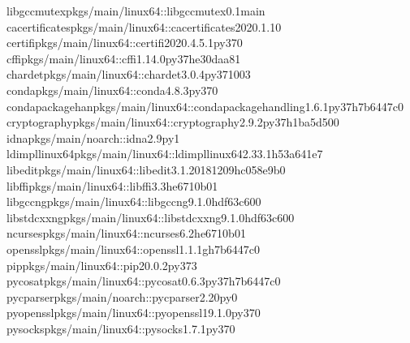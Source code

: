 \documentclass[a4paper,10pt,english]{sphinxmanual}
\begin{document}
\begin{sphinxVerbatim}[commandchars=\\\{\}]
\PYGZus{}libgcc\PYGZus{}mutexpkgs/main/linux\PYGZhy{}64::\PYGZus{}libgcc\PYGZus{}mutex\PYGZhy{}0.1\PYGZhy{}main
ca\PYGZhy{}certificatespkgs/main/linux\PYGZhy{}64::ca\PYGZhy{}certificates\PYGZhy{}2020.1.1\PYGZhy{}0
certifipkgs/main/linux\PYGZhy{}64::certifi\PYGZhy{}2020.4.5.1\PYGZhy{}py37\PYGZus{}0
cffipkgs/main/linux\PYGZhy{}64::cffi\PYGZhy{}1.14.0\PYGZhy{}py37he30daa8\PYGZus{}1
chardetpkgs/main/linux\PYGZhy{}64::chardet\PYGZhy{}3.0.4\PYGZhy{}py37\PYGZus{}1003
condapkgs/main/linux\PYGZhy{}64::conda\PYGZhy{}4.8.3\PYGZhy{}py37\PYGZus{}0
conda\PYGZhy{}package\PYGZhy{}han\PYGZti{}pkgs/main/linux\PYGZhy{}64::conda\PYGZhy{}package\PYGZhy{}handling\PYGZhy{}1.6.1\PYGZhy{}py37h7b6447c\PYGZus{}0
cryptographypkgs/main/linux\PYGZhy{}64::cryptography\PYGZhy{}2.9.2\PYGZhy{}py37h1ba5d50\PYGZus{}0
idnapkgs/main/noarch::idna\PYGZhy{}2.9\PYGZhy{}py\PYGZus{}1
ld\PYGZus{}impl\PYGZus{}linux\PYGZhy{}64pkgs/main/linux\PYGZhy{}64::ld\PYGZus{}impl\PYGZus{}linux\PYGZhy{}64\PYGZhy{}2.33.1\PYGZhy{}h53a641e\PYGZus{}7
libeditpkgs/main/linux\PYGZhy{}64::libedit\PYGZhy{}3.1.20181209\PYGZhy{}hc058e9b\PYGZus{}0
libffipkgs/main/linux\PYGZhy{}64::libffi\PYGZhy{}3.3\PYGZhy{}he6710b0\PYGZus{}1
libgcc\PYGZhy{}ngpkgs/main/linux\PYGZhy{}64::libgcc\PYGZhy{}ng\PYGZhy{}9.1.0\PYGZhy{}hdf63c60\PYGZus{}0
libstdcxx\PYGZhy{}ngpkgs/main/linux\PYGZhy{}64::libstdcxx\PYGZhy{}ng\PYGZhy{}9.1.0\PYGZhy{}hdf63c60\PYGZus{}0
ncursespkgs/main/linux\PYGZhy{}64::ncurses\PYGZhy{}6.2\PYGZhy{}he6710b0\PYGZus{}1
opensslpkgs/main/linux\PYGZhy{}64::openssl\PYGZhy{}1.1.1g\PYGZhy{}h7b6447c\PYGZus{}0
pippkgs/main/linux\PYGZhy{}64::pip\PYGZhy{}20.0.2\PYGZhy{}py37\PYGZus{}3
pycosatpkgs/main/linux\PYGZhy{}64::pycosat\PYGZhy{}0.6.3\PYGZhy{}py37h7b6447c\PYGZus{}0
pycparserpkgs/main/noarch::pycparser\PYGZhy{}2.20\PYGZhy{}py\PYGZus{}0
pyopensslpkgs/main/linux\PYGZhy{}64::pyopenssl\PYGZhy{}19.1.0\PYGZhy{}py37\PYGZus{}0
pysockspkgs/main/linux\PYGZhy{}64::pysocks\PYGZhy{}1.7.1\PYGZhy{}py37\PYGZus{}0

\end{sphinxVerbatim}
\end{document}
